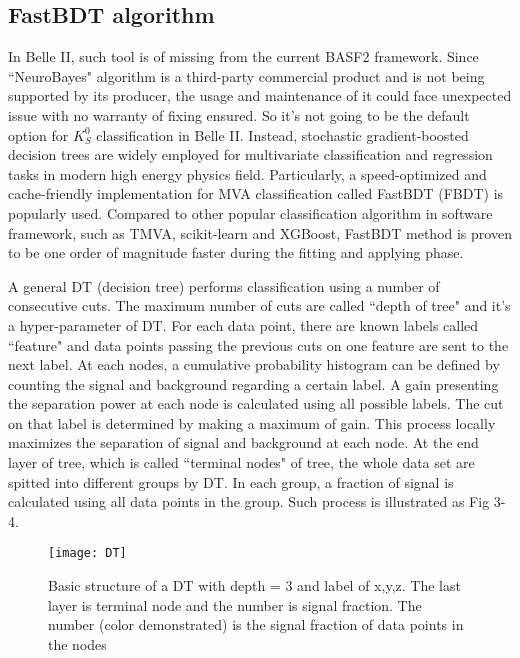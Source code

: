 
\subsection{FastBDT algorithm}
In Belle II, such tool is of missing from the current BASF2 framework. Since ``NeuroBayes" algorithm is a third-party commercial product and is not being supported by its producer, the usage and maintenance of it could face unexpected issue with no warranty of fixing ensured. So it's not going to be the default option for $K_S^0$ classification in Belle II. Instead,  stochastic gradient-boosted decision trees are widely employed for multivariate classification and regression tasks in modern high energy physics field. Particularly, a speed-optimized and cache-friendly
implementation for MVA classification called FastBDT (FBDT) is popularly used. Compared to other popular classification algorithm in software framework, such as TMVA, scikit-learn and XGBoost, FastBDT method is proven to be one order of magnitude faster during the fitting  and applying phase. 

A general DT (decision tree) performs classification using a number of consecutive cuts. The maximum number of cuts are called ``depth of tree" and it's a hyper-parameter of DT. For each data point, there are known labels called ``feature" and data points passing the previous cuts on one feature are sent to the next label. At each nodes, a cumulative probability histogram can be defined by counting the signal and background regarding a certain label. A gain presenting the separation power at each node is calculated using all possible labels. The cut on that label is determined by making a maximum of gain. This process locally maximizes the separation of signal and background at each node. At the end layer of tree, which is called ``terminal nodes" of tree, the whole data set are spitted into different groups by DT. In each group, a fraction of signal is calculated using all data points in the group. Such process is illustrated as Fig 3-4. 

\begin{figure}[htpb]
	\centering 
	\texttt{[image: DT]}
	\caption{Basic structure of a DT with depth = 3 and label of x,y,z. The last layer is terminal node and the number is signal fraction. The number (color demonstrated) is the signal fraction of data points in the nodes}
\end{figure}


